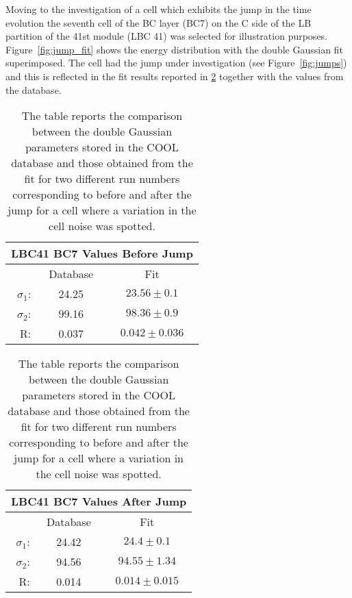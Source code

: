 Moving to the investigation of a cell which exhibits the jump in the time
evolution the seventh cell of the BC layer (BC7) on the C side of the LB
partition of the 41st module (LBC 41) was selected for illustration purposes.
Figure~\ref{fig:jump_fit} shows the energy distribution with the double Gaussian
fit superimposed. The cell had the jump under investigation (see
Figure~\ref{fig:jumps}) and this is reflected in the fit results reported in
\cref{tab:jump_fit} together with the values from the database.
\begin{table}[!h]
  \centering
  \begin{tabular}{r c c}
    \toprule
    \multicolumn{3}{c}{LBC41 BC7 Values Before Jump} \\
    \midrule \midrule
    \quad & Database  & Fit \\
    \midrule
    $\sigma_1$: & 24.25  & $23.56 \pm 0.1$ \\
    $\sigma_2$: & 99.16 & $98.36 \pm 0.9$ \\
    R\@: & 0.037  & $0.042 \pm 0.036$ \\
    \bottomrule
  \end{tabular} \quad
  \begin{tabular}{r c c}
    \toprule
    \multicolumn{3}{c}{LBC41 BC7 Values After Jump} \\
    \midrule \midrule
    \quad & Database & Fit \\
    \midrule
    $\sigma_1$: & 24.42 & $24.4 \pm 0.1$ \\
    $\sigma_2$: & 94.56 & $94.55 \pm 1.34$ \\
    R\@: & 0.014 & $0.014 \pm 0.015$ \\
    \bottomrule
  \end{tabular}
  \caption{The table reports the comparison between the double Gaussian
    parameters stored in the COOL database and those obtained from the
    fit for two different run numbers corresponding to before and after the
    jump for a cell where a variation in the cell noise was spotted.}
  \label{tab:jump_fit}
\end{table}

